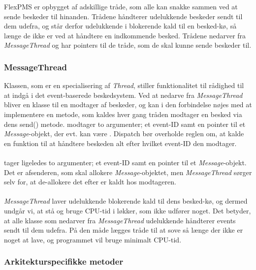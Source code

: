 FlexPMS er opbygget af adskillige tråde, som alle kan snakke sammen ved at sende beskeder til hinanden. Trådene håndterer udelukkende beskeder sendt til dem udefra, og står derfor udelukkende i blokerende kald til en besked-kø, så længe de ikke er ved at håndtere en indkommende besked. Trådene nedarver fra \textit{MessageThread} og har pointers til de tråde, som de skal kunne sende beskeder til.



\subsubsection{MessageThread}
Klassen, som er en specialisering af \textit{Thread}, stiller funktionalitet til rådighed til at indgå i det event-baserede beskedsystem. Ved at nedarve fra \textit{MessageThread} bliver en klasse til en modtager af beskeder, og kan i den forbindelse nøjes med at implementere en  metode, som kaldes hver gang tråden modtager en besked via dens send() metode.  modtager to argumenter; et event-ID samt en pointer til et \textit{Message}-objekt, der evt. kan være . Dispatch bør overholde reglen om, at kalde en funktion til at håndtere beskeden alt efter hvilket event-ID den modtager.\\\\

 tager ligeledes to argumenter; et event-ID samt en pointer til et \textit{Message}-objekt. Det er afsenderen, som skal allokere \textit{Message}-objektet, men \textit{MessageThread} sørger selv for, at de-allokere det efter  er kaldt hos modtageren.\\\\

\textit{MessageThread} laver udelukkende blokerende kald til dens besked-kø, og dermed undgår vi, at stå og bruge CPU-tid i løkker, som ikke udfører noget. Det betyder, at alle klasse som nedarver fra \textit{MessageThread} udelukkende håndterer events sendt til dem udefra. På den måde lægges tråde til at sove så længe der ikke er noget at lave, og programmet vil bruge minimalt CPU-tid.



\subsubsection{Arkitekturspecifikke metoder}

